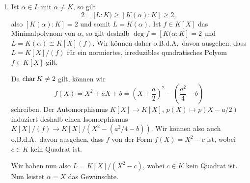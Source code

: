 \begin{solution}
  \begin{enumerate}
    \item
      Ist $\alpha \in L$ mit $\alpha \neq K$, so gilt
      \[
              2
        =     [L : K)
        \geq  [K(\alpha) : K]
        \geq  2,
      \]
      also $[K(\alpha) : K] = 2$ und somit $L = K(\alpha)$.
      Ist $f \in K[X]$ das Minimalpolynom von $\alpha$, so gilt deshalb $\deg f = [K(\alpha : K] = 2$ und $L = K(\alpha) \cong K[X](f)$.
      Wir können daher o.B.d.A.\ davon ausgehen, dass $L = K[X]/(f)$ für ein normiertes, irreduzibles quadratisches Polyom $f \in K[X]$ gilt.
      
      Da $\operatorname{char} K \neq 2$ gilt, können wir
      \[
          f(X)
        = X^2 + aX + b
        = \left( X + \frac{a}{2} \right)^2 - \left( \frac{a^2}{4} - b\right)
      \]
      schreiben.
      Der Automorphismus $K[X] \to K[X]$, $p(X) \mapsto p(X - a/2)$ induziert deshalb einen Isomorphismus $K[X]/(f) \to K[X]/(X^2 - (a^2/4 - b))$.
      Wir können also auch o.B.d.A.\ davon ausgehen, dass $f$ von der Form $f(X) = X^2 - c$ ist, wobei $c \in K$ kein Quadrat ist.
      
      Wir haben nun also $L = K[X]/(X^2 - c)$, wobei $c \in K$ kein Quadrat ist.
      Nun leistet $\alpha = \overline{X}$ das Gewünschte.
    

\end{enumerate}
\end{solution}
